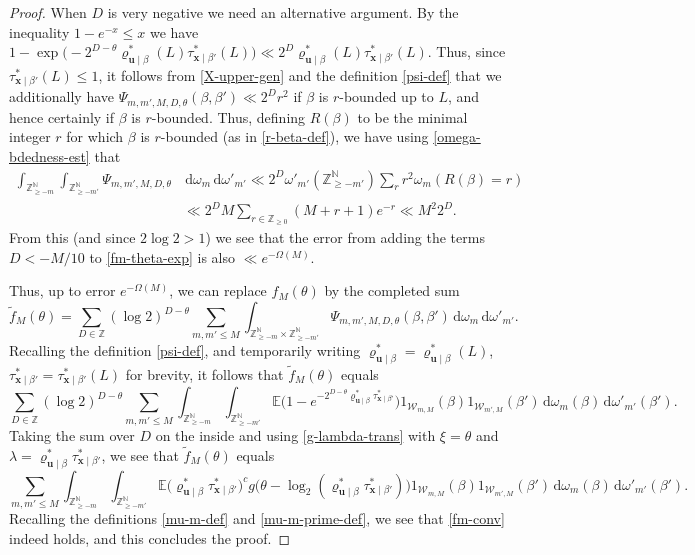 \documentclass[11pt,reqno]{amsart}
\numberwithin{equation}{section}
\theoremstyle{definition}
\theoremstyle{remark}
\newcommand{\mb}{\mathbb}
\newcommand{\mbf}{\mathbf}
\renewcommand{\le}{\leqslant}
\renewcommand{\ge}{\geqslant}
\newcommand\Z{\mathbb{Z}}
\newcommand\N{\mathbb{N}}
\begin{document}
\begin{proof}
When $D$ is very negative we need an alternative argument. By the inequality $1 - e^{-x} \le x$ we have $1 - \exp\big({-}2^{D - \theta}  \varrho^*_{\mbf{u} \mid \beta}(L) \tau^*_{\mbf{x} \mid \beta'}(L)\big) \ll 2^{D}  \varrho^*_{\mbf{u} \mid \beta}(L) \tau^*_{\mbf{x} \mid \beta'}(L)$. Thus, since $\tau^*_{\mbf{x} \mid \beta'}(L) \le 1$, it follows from \cref{X-upper-gen} and the definition \cref{psi-def} that we additionally have $\Psi_{m,m',M,D,\theta}(\beta, \beta') \ll 2^D r^2$ if $\beta$ is $r$-bounded up to $L$, and hence certainly if $\beta$ is $r$-bounded. Thus, defining $R(\beta)$ to be the minimal integer $r$ for which $\beta$ is $r$-bounded (as in \cref{r-beta-def}), we have using \cref{omega-bdedness-est} that
\begin{align*} \int_{\Z^\N_{\ge -m}}\int_{\Z^\N_{\ge -m'}} \Psi_{m,m',M,D,\theta} & \, \mathrm{d}\omega_m \, \mathrm{d}\omega'_{m'} \ll 2^D \omega'_{m'}(\Z^{\N}_{\ge -m'}) \sum_r r^2 \omega_m(R(\beta) = r) \\ & \ll 2^D M \sum_{r \in \Z_{\ge 0}} (M + r + 1)e^{-r} \ll M^{2} 2^D. \end{align*}
From this (and since $2 \log 2 > 1$) we see that the error from adding the terms $D < -M/10$ to \cref{fm-theta-exp} is also $\ll e^{-\Omega(M)}$.


Thus, up to error $e^{-\Omega(M)}$, we can replace $f_M(\theta)$ by the completed sum
\begin{equation*} \tilde f_M(\theta) =  \sum_{D \in \Z} (\log 2)^{D - \theta} \sum_{m, m' \le M} \int_{\Z^\N_{\ge -m} \times \Z^\N_{\ge -m'}}  \Psi_{m,m',M,D,\theta}(\beta, \beta') \, \mathrm{d}\omega_m \, \mathrm{d}\omega'_{m'}.
\end{equation*}
Recalling the definition \cref{psi-def}, and temporarily writing $\varrho^*_{\mbf{u} \mid \beta} = \varrho^*_{\mbf{u} \mid \beta}(L)$, $\tau^*_{\mbf{x} \mid \beta'} = \tau^*_{\mbf{x} \mid \beta'}(L)$ for brevity, it follows that $\tilde f_M(\theta)$ equals
\[  \sum_{D \in \Z} (\log 2)^{D - \theta}  \sum_{m,m' \le M} \int_{\Z^\N_{\ge -m}}\int_{\Z^\N_{\ge -m'}} \mb{E} \big(1 - e^{-2^{D - \theta}\varrho^*_{\mbf{u} \mid \beta}\tau^*_{\mbf{x} \mid \beta'}}\big)  1_{\mathscr{W}_{m,M}}(\beta) 1_{\mathscr{W}_{m',M}}(\beta') \, \mathrm{d}\omega_m(\beta) \, \mathrm{d}\omega'_{m'}(\beta').
\]
Taking the sum over $D$ on the inside and using \cref{g-lambda-trans} with $\xi= \theta$ and $\lambda = \varrho^*_{\mbf{u} \mid \beta}\tau^*_{\mbf{x} \mid \beta'}$, we see that $\tilde f_M(\theta)$ equals
\[  \sum_{m,m' \le M}\int_{\Z^\N_{\ge -m}}\int_{\Z^\N_{\ge -m'}} \mb{E} \big(\varrho^*_{\mbf{u} \mid \beta}\tau^*_{\mbf{x} \mid \beta'} \big)^c g\big(\theta - \log_2( \varrho^*_{\mbf{u} \mid \beta} \tau^*_{\mbf{x} \mid \beta'})\big) 1_{\mathscr{W}_{m,M}}(\beta) 1_{\mathscr{W}_{m',M}}(\beta') \, \mathrm{d}\omega_m(\beta) \, \mathrm{d}\omega'_{m'}(\beta') . \]  Recalling the definitions \cref{mu-m-def} and \cref{mu-m-prime-def}, we see that \cref{fm-conv} indeed holds, and this concludes the proof.\end{proof}
\end{document}
